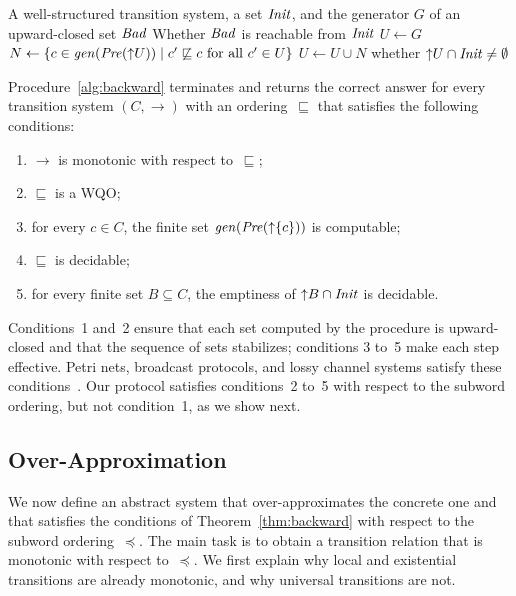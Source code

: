 \begin{algorithm}[ht]
\caption{Backward reachability analysis}
\label{alg:backward}
\begin{algorithmic}[1]
\REQUIRE A well-structured transition system, a set $\mathit{Init}$, and the generator $G$ of an upward-closed set $\mathit{Bad}$
\ENSURE Whether $\mathit{Bad}$ is reachable from $\mathit{Init}$
\STATE $U \leftarrow G$
\REPEAT
  \STATE $N \leftarrow \{ c \in \mathit{gen}(\mathit{Pre}({\uparrow}U)) \mid c' \not\sqsubseteq c \text{ for all } c' \in U \}$
  \STATE $U \leftarrow U \cup N$
\RETURN whether ${\uparrow}U \cap \mathit{Init} \neq \emptyset$
\end{algorithmic}
\end{algorithm}

\begin{theorem}
\label{thm:backward}
Procedure~\ref{alg:backward} terminates and returns the correct answer for every
transition system $(C, \to)$ with an ordering~$\sqsubseteq$ that satisfies the
following conditions:
\begin{enumerate}[nosep]
\item $\to$ is monotonic with respect to~$\sqsubseteq$;
\item $\sqsubseteq$ is a WQO;
\item for every $c \in C$, the finite set $\mathit{gen}(\mathit{Pre}({\uparrow}\{c\}))$ is
computable;
\item $\sqsubseteq$ is decidable;
\item for every finite set $B \subseteq C$, the emptiness of ${\uparrow}B \cap
\mathit{Init}$ is decidable.
\end{enumerate}
\end{theorem}

Conditions~1 and~2 ensure that each set computed by the procedure is
upward-closed and that the sequence of sets stabilizes; conditions 3 to~5 make
each step effective. Petri nets, broadcast protocols, and lossy channel systems
satisfy these conditions~\cite{ACJT96,EFM99}. Our protocol satisfies
conditions~2 to~5 with respect to the subword ordering, but not condition~1, as
we show next.

\subsection{Over-Approximation}

We now define an abstract system that over-approximates the concrete one and
that satisfies the conditions of Theorem~\ref{thm:backward} with respect to the
subword ordering~$\preceq$. The main task is to obtain
a transition relation that is monotonic with respect to~$\preceq$. We first
explain why local and existential transitions are already monotonic, and why
universal transitions are not.

